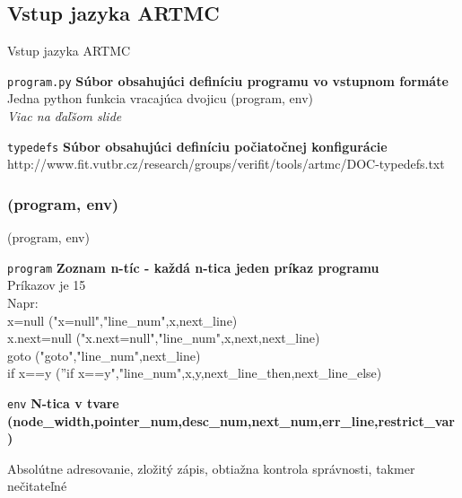 \documentclass[slovak]{beamer}
\begin{document}
\subsection{Vstup jazyka ARTMC}
\begin{frame}{Vstup jazyka ARTMC}
\begin{block}{\texttt{program.py}}
\textbf{Súbor obsahujúci definíciu programu vo vstupnom formáte}\\
Jedna python funkcia vracajúca dvojicu (program, env)\\
\textit{Viac na ďaľšom slide}
\end{block}
\begin{block}{\texttt{typedefs}}
\textbf{Súbor obsahujúci definíciu počiatočnej konfigurácie}\\
http://www.fit.vutbr.cz/research/groups/verifit/tools/artmc/DOC-typedefs.txt
\end{block}
\end{frame}


\subsubsection{(program, env)}
\begin{frame}{(program, env)}
\begin{block}{\texttt{program}}
\textbf{Zoznam n-tíc - každá n-tica jeden príkaz programu}\\
Príkazov je 15\\
Napr:\\
x=null	\rightarrow			("x=null","line\_num",x,next\_line)\\
x.next=null	\rightarrow		("x.next=null","line\_num",x,next,next\_line)\\
goto	\rightarrow			("goto","line\_num",next\_line)\\
if x==y	 \rightarrow	
(''if x==y","line\_num",x,y,next\_line\_then,next\_line\_else)
\end{block}
\begin{block}{\texttt{env}}
\textbf{N-tica v tvare (node\_width,pointer\_num,desc\_num,next\_num,err\_line,restrict\_var)}
\end{block}

\begin{alertblock}{}
Absolútne adresovanie, zložitý zápis, obtiažna kontrola správnosti, takmer nečitateľné
\end{alertblock}
\end{frame}

\end{document}
